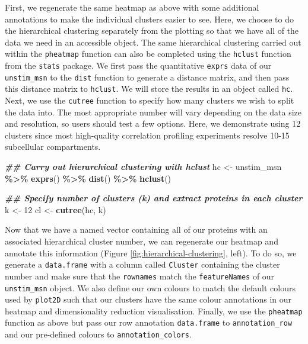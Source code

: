 \documentclass[9pt,a4paper,]{extarticle}
\newenvironment{Shaded}{\begin{snugshade}}{\end{snugshade}}
\newcommand{\DecValTok}[1]{\textcolor[rgb]{0.00,0.00,0.81}{#1}}
\newcommand{\DocumentationTok}[1]{\textcolor[rgb]{0.56,0.35,0.01}{\textbf{\textit{#1}}}}
\newcommand{\FunctionTok}[1]{\textcolor[rgb]{0.13,0.29,0.53}{\textbf{#1}}}
\newcommand{\NormalTok}[1]{#1}
\newcommand{\OtherTok}[1]{\textcolor[rgb]{0.56,0.35,0.01}{#1}}
\newcommand{\SpecialCharTok}[1]{\textcolor[rgb]{0.81,0.36,0.00}{\textbf{#1}}}
\begin{document}
First, we regenerate the same heatmap as above with some additional annotations
to make the individual clusters easier to see. Here, we choose to do the
hierarchical clustering separately from the plotting so that we have all of the
data we need in an accessible object. The same hierarchical clustering carried
out within the \texttt{pheatmap} function can also be completed using the \texttt{hclust}
function from the \texttt{stats} package. We first pass the quantitative \texttt{exprs} data
of our \texttt{unstim\_msn} to the \texttt{dist} function to generate a distance matrix, and
then pass this distance matrix to \texttt{hclust}. We will store the results in an
object called \texttt{hc}. Next, we use the \texttt{cutree} function to specify how many
clusters we wish to split the data into. The most appropriate number will vary
depending on the data size and resolution, so users should test a few options.
Here, we demonstrate using 12 clusters since most high-quality correlation
profiling experiments resolve 10-15 subcellular compartments.

\begin{Shaded}
\begin{Highlighting}[]
\DocumentationTok{\#\# Carry out hierarchical clustering with hclust}
\NormalTok{hc }\OtherTok{\textless{}{-}}\NormalTok{ unstim\_msn }\SpecialCharTok{\%\textgreater{}\%}
  \FunctionTok{exprs}\NormalTok{() }\SpecialCharTok{\%\textgreater{}\%}
  \FunctionTok{dist}\NormalTok{() }\SpecialCharTok{\%\textgreater{}\%}
  \FunctionTok{hclust}\NormalTok{()}

\DocumentationTok{\#\# Specify number of clusters (k) and extract proteins in each cluster}
\NormalTok{k }\OtherTok{\textless{}{-}} \DecValTok{12}
\NormalTok{cl }\OtherTok{\textless{}{-}} \FunctionTok{cutree}\NormalTok{(hc, k)}
\end{Highlighting}
\end{Shaded}

Now that we have a named vector containing all of our proteins with an associated
hierarchical cluster number, we can regenerate our heatmap and annotate this
information (Figure \ref{fig:hierarchical-clustering}, left). To do so, we generate
a \texttt{data.frame} with a column called \texttt{Cluster} containing the cluster number and
make sure that the \texttt{rownames} match the \texttt{featureNames} of our \texttt{unstim\_msn} object.
We also define our own colours to match the default colours used by \texttt{plot2D} such
that our clusters have the same colour annotations in our heatmap and dimensionality
reduction visualisation. Finally, we use the \texttt{pheatmap} function as above but pass
our row annotation \texttt{data.frame} to \texttt{annotation\_row} and our pre-defined colours
to \texttt{annotation\_colors}.
\end{document}
